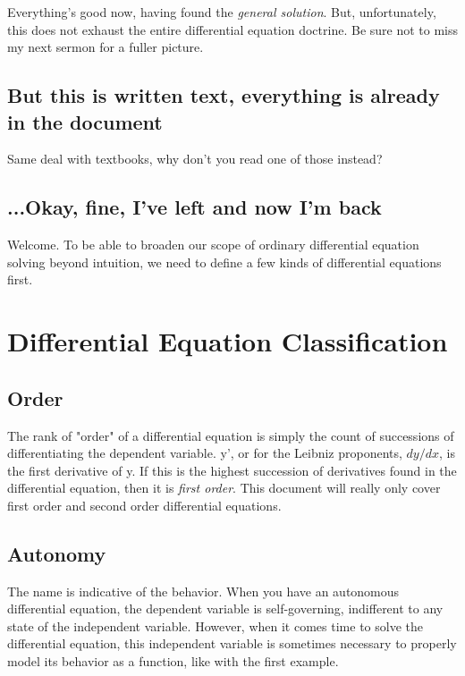 \documentclass[10pt]{extarticle}
\begin{document}
\begin{multicols}{2}
Everything's good now, having found the {\em general solution}. But,
unfortunately, this does not exhaust the entire differential equation doctrine.
Be sure not to miss my next sermon for a fuller picture.


\subsection{But this is written text, everything is already in the document}

Same deal with textbooks, why don't you read one of those instead?


\subsection{...Okay, fine, I've left and now I'm back}

Welcome. To be able to broaden our scope of ordinary differential equation
solving beyond intuition, we need to define a few kinds of differential
equations first.


\section{Differential Equation Classification}

\subsection{Order}

The rank of "order" of a differential equation is simply the count of
successions of differentiating the dependent variable. y', or for the Leibniz
proponents, \(dy/dx\), is the first derivative of y. If this is the highest
succession of derivatives found in the differential equation, then it is {\em
first order}. This document will really only cover first order and second order
differential equations.


\subsection{Autonomy}

The name is indicative of the behavior. When you have an autonomous
differential equation, the dependent variable is self-governing, indifferent to
any state of the independent variable. However, when it comes time to solve the
differential equation, this independent variable is sometimes necessary to
properly model its behavior as a function, like with the first example. 



\end{multicols}
\end{document}
